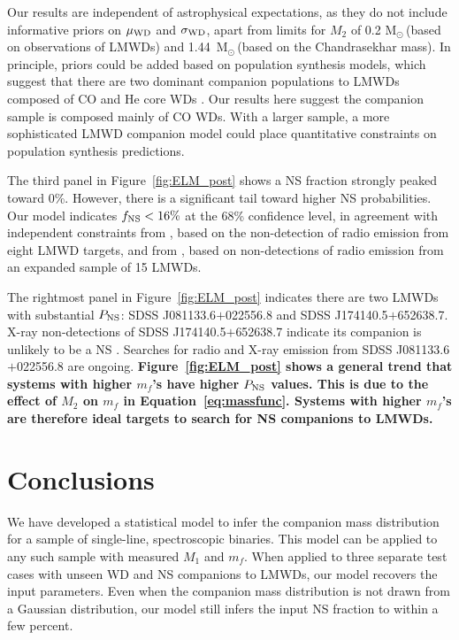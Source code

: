 \documentclass[apjl]{emulateapj}
\newcommand{\Msun}{\ifmmode {{\rm M}_{\odot}}\else M$_{\odot}$\fi}
\newcommand{\mf}{m_f}
\newcommand{\wdupper}{1.44}
\begin{document}
Our results are independent of astrophysical expectations, as they do not include informative priors on $\mu_{\rm WD}$ and $\sigma_{\rm WD}$, apart from limits for $M_2$ of 0.2 \Msun\,(based on observations of LMWDs) and \wdupper~\Msun\,(based on the Chandrasekhar mass). In principle, priors could be added based on population synthesis models, which suggest that there are two dominant companion populations to LMWDs composed of CO and He core WDs \citep{han98, toonen12}. Our results here suggest the companion sample is composed mainly of CO WDs. With a larger sample, a more sophisticated LMWD companion model could place quantitative constraints on population synthesis predictions.







The third panel in Figure~\ref{fig:ELM_post} shows a NS fraction strongly peaked toward 0\%. However, there is a significant tail toward higher NS probabilities. Our model indicates $f_{\rm NS} <16\%$ at the 68\% confidence level, in agreement with independent constraints from \citet[][$f_{\rm NS}<18\pm5$\%]{vLeeuwen07}, based on the non-detection of radio emission from eight LMWD targets, and from \citet[][$f_{\rm NS}<10\substack{+4 \\ -2}~\%$]{agueros09b}, based on non-detections of radio emission from an expanded sample of 15 LMWDs. 


The rightmost panel in Figure~\ref{fig:ELM_post} indicates there are two LMWDs with substantial $P_{\rm NS}$: SDSS J081133.6$+$022556.8 and SDSS J174140.5$+$652638.7. X-ray non-detections of SDSS J174140.5$+$652638.7 indicate its companion is unlikely to be a NS \citep{kilic14}. Searches for radio and X-ray emission from SDSS J081133.6$+$022556.8 are ongoing. {\bf Figure~\ref{fig:ELM_post} shows a general trend that systems with higher $\mf$'s have higher $P_{\rm NS}$ values. This is due to the effect of $M_2$ on $\mf$ in Equation~\ref{eq:massfunc}. Systems with higher $\mf$'s are therefore ideal targets to search for NS companions to LMWDs.}


\section{Conclusions}

We have developed a statistical model to infer the companion mass distribution for a sample of single-line, spectroscopic binaries. This model can be applied to any such sample with measured $M_1$ and $\mf$. When applied to three separate test cases with unseen WD and NS companions to LMWDs, our model recovers the input parameters. Even when the companion mass distribution is not drawn from a Gaussian distribution, our model still infers the input NS fraction to within a few percent.  
\end{document}
